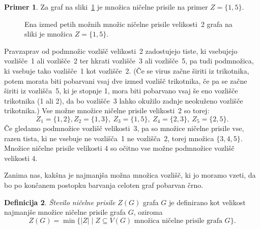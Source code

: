 \documentclass[12pt,a4paper,twoside]{article}
\theoremstyle{definition} %
\newtheorem{definicija}{Definicija}[section]
\newtheorem{primer}[definicija]{Primer}
\theoremstyle{plain} %
\numberwithin{equation}{section}  %
\begin{document}
\begin{primer}
    Za graf na sliki~\ref{fig:osnovni-primer-prisile} je množica ničelne prisile na primer $Z = \{ 1, 5\}$. 
    \begin{figure}[h]
        \centering
        \caption{Ena izmed petih možnih množic ničelne prisile velikosti~2 grafa na sliki je množica $Z =\{1,5\}$.}
        \label{fig:osnovni-primer-prisile}
    \end{figure}
    Pravzaprav od podmnožic vozlišč velikosti~2 zadostujejo tiste, ki vsebujejo vozlišče~1 ali vozlišče~2 ter hkrati vozlišče~3 ali vozlišče~5, pa tudi podmnožica, ki vsebuje tako vozlišče~1 kot vozlišče~2. (Če se virus začne širiti iz trikotnika, potem morata biti pobarvani vsaj dve izmed vozlišč trikotnika, če pa se začne širiti iz vozlišča~5, ki je stopnje 1, mora biti pobarvano vsaj še eno vozlišče trikotnika (1 ali 2), da bo vozlišče~3 lahko okužilo zadnje neokuženo vozlišče trikotnika.) Vse možne množice ničelne prisile velikosti~2 so torej:
    \[ Z_1 = \{ 1, 2\}, Z_2 = \{ 1, 3\},\ Z_3 = \{ 1, 5\},\ Z_4 = \{ 2, 3\},\ Z_5 = \{2, 5\}. \]
    Če gledamo podmnožice vozlišč velikosti~3, pa so množice ničelne prisile vse, razen tista, ki ne vsebuje ne vozlišča~1 ne vozlišča~2, torej množica $\{3, 4, 5\}$. Množice ničelne prisile velikosti 4 so očitno vse možne podmnožice vozlišč velikosti 4.
\end{primer}

Zanima nas, kakšna je najmanjša možna množica vozlišč, ki jo moramo vzeti, da bo po končanem postopku barvanja celoten graf pobarvan črno. 

\begin{definicija}
    \emph{Število ničelne prisile} $Z(G)$ grafa $G$ je definirano kot velikost najmanjše množice ničelne prisile grafa $G$, oziroma
    \[ Z(G) = \min \{|Z| \mid Z \subseteq V(G) \text{ množica ničelne prisile grafa } G \}. \]
\end{definicija}
\end{document}
